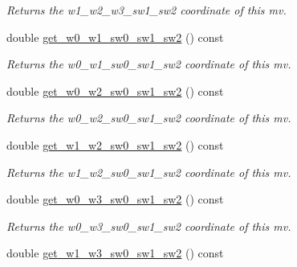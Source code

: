 \begin{DoxyCompactItemize}
\begin{DoxyCompactList}\small\item\em Returns the w1\-\_\-w2\-\_\-w3\-\_\-sw1\-\_\-sw2 coordinate of this mv. \end{DoxyCompactList}\item 
\hypertarget{classe3ga_1_1mv_a3f3664081929bf01be6535c70f5866ae}{double \hyperlink{classe3ga_1_1mv_a3f3664081929bf01be6535c70f5866ae}{get\-\_\-w0\-\_\-w1\-\_\-sw0\-\_\-sw1\-\_\-sw2} () const }\label{classe3ga_1_1mv_a3f3664081929bf01be6535c70f5866ae}

\begin{DoxyCompactList}\small\item\em Returns the w0\-\_\-w1\-\_\-sw0\-\_\-sw1\-\_\-sw2 coordinate of this mv. \end{DoxyCompactList}\item 
\hypertarget{classe3ga_1_1mv_a3f32ce5468e6850a8ac253fb78a05039}{double \hyperlink{classe3ga_1_1mv_a3f32ce5468e6850a8ac253fb78a05039}{get\-\_\-w0\-\_\-w2\-\_\-sw0\-\_\-sw1\-\_\-sw2} () const }\label{classe3ga_1_1mv_a3f32ce5468e6850a8ac253fb78a05039}

\begin{DoxyCompactList}\small\item\em Returns the w0\-\_\-w2\-\_\-sw0\-\_\-sw1\-\_\-sw2 coordinate of this mv. \end{DoxyCompactList}\item 
\hypertarget{classe3ga_1_1mv_a2962f8af85365e1b7858a8d7eb34da5a}{double \hyperlink{classe3ga_1_1mv_a2962f8af85365e1b7858a8d7eb34da5a}{get\-\_\-w1\-\_\-w2\-\_\-sw0\-\_\-sw1\-\_\-sw2} () const }\label{classe3ga_1_1mv_a2962f8af85365e1b7858a8d7eb34da5a}

\begin{DoxyCompactList}\small\item\em Returns the w1\-\_\-w2\-\_\-sw0\-\_\-sw1\-\_\-sw2 coordinate of this mv. \end{DoxyCompactList}\item 
\hypertarget{classe3ga_1_1mv_a120f97008b74d69a3fe57289819f3968}{double \hyperlink{classe3ga_1_1mv_a120f97008b74d69a3fe57289819f3968}{get\-\_\-w0\-\_\-w3\-\_\-sw0\-\_\-sw1\-\_\-sw2} () const }\label{classe3ga_1_1mv_a120f97008b74d69a3fe57289819f3968}

\begin{DoxyCompactList}\small\item\em Returns the w0\-\_\-w3\-\_\-sw0\-\_\-sw1\-\_\-sw2 coordinate of this mv. \end{DoxyCompactList}\item 
\hypertarget{classe3ga_1_1mv_a8f3ff08c9d7976657f1dc04adf0549e3}{double \hyperlink{classe3ga_1_1mv_a8f3ff08c9d7976657f1dc04adf0549e3}{get\-\_\-w1\-\_\-w3\-\_\-sw0\-\_\-sw1\-\_\-sw2} () const }\label{classe3ga_1_1mv_a8f3ff08c9d7976657f1dc04adf0549e3}


\end{DoxyCompactItemize}
